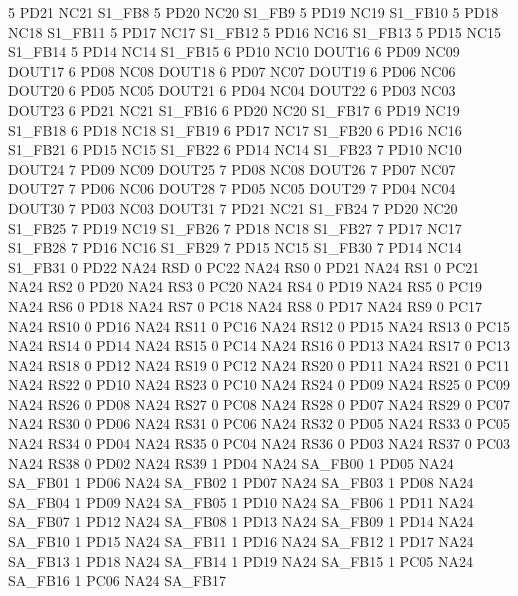 5   PD21    NC21    S1_FB8
5   PD20    NC20    S1_FB9
5   PD19    NC19    S1_FB10
5   PD18    NC18    S1_FB11
5   PD17    NC17    S1_FB12
5   PD16    NC16    S1_FB13
5   PD15    NC15    S1_FB14
5   PD14    NC14    S1_FB15
6   PD10    NC10    DOUT16
6   PD09    NC09    DOUT17
6   PD08    NC08    DOUT18
6   PD07    NC07    DOUT19
6   PD06    NC06    DOUT20
6   PD05    NC05    DOUT21
6   PD04    NC04    DOUT22
6   PD03    NC03    DOUT23
6   PD21    NC21    S1_FB16
6   PD20    NC20    S1_FB17
6   PD19    NC19    S1_FB18
6   PD18    NC18    S1_FB19
6   PD17    NC17    S1_FB20
6   PD16    NC16    S1_FB21
6   PD15    NC15    S1_FB22
6   PD14    NC14    S1_FB23
7   PD10    NC10    DOUT24
7   PD09    NC09    DOUT25
7   PD08    NC08    DOUT26
7   PD07    NC07    DOUT27
7   PD06    NC06    DOUT28
7   PD05    NC05    DOUT29
7   PD04    NC04    DOUT30
7   PD03    NC03    DOUT31
7   PD21    NC21    S1_FB24
7   PD20    NC20    S1_FB25
7   PD19    NC19    S1_FB26
7   PD18    NC18    S1_FB27
7   PD17    NC17    S1_FB28
7   PD16    NC16    S1_FB29
7   PD15    NC15    S1_FB30
7   PD14    NC14    S1_FB31
0   PD22    NA24    RSD
0   PC22    NA24    RS0
0   PD21    NA24    RS1
0   PC21    NA24    RS2
0   PD20    NA24    RS3
0   PC20    NA24    RS4
0   PD19    NA24    RS5
0   PC19    NA24    RS6
0   PD18    NA24    RS7
0   PC18    NA24    RS8
0   PD17    NA24    RS9
0   PC17    NA24    RS10
0   PD16    NA24    RS11
0   PC16    NA24    RS12
0   PD15    NA24    RS13
0   PC15    NA24    RS14
0   PD14    NA24    RS15
0   PC14    NA24    RS16
0   PD13    NA24    RS17
0   PC13    NA24    RS18
0   PD12    NA24    RS19
0   PC12    NA24    RS20
0   PD11    NA24    RS21
0   PC11    NA24    RS22
0   PD10    NA24    RS23
0   PC10    NA24    RS24
0   PD09    NA24    RS25
0   PC09    NA24    RS26
0   PD08    NA24    RS27
0   PC08    NA24    RS28
0   PD07    NA24    RS29
0   PC07    NA24    RS30
0   PD06    NA24    RS31
0   PC06    NA24    RS32
0   PD05    NA24    RS33
0   PC05    NA24    RS34
0   PD04    NA24    RS35
0   PC04    NA24    RS36
0   PD03    NA24    RS37
0   PC03    NA24    RS38
0   PD02    NA24    RS39
1   PD04    NA24    SA_FB00
1   PD05    NA24    SA_FB01
1   PD06    NA24    SA_FB02
1   PD07    NA24    SA_FB03
1   PD08    NA24    SA_FB04
1   PD09    NA24    SA_FB05
1   PD10    NA24    SA_FB06
1   PD11    NA24    SA_FB07
1   PD12    NA24    SA_FB08
1   PD13    NA24    SA_FB09
1   PD14    NA24    SA_FB10
1   PD15    NA24    SA_FB11
1   PD16    NA24    SA_FB12
1   PD17    NA24    SA_FB13
1   PD18    NA24    SA_FB14
1   PD19    NA24    SA_FB15
1   PC05    NA24    SA_FB16
1   PC06    NA24    SA_FB17
